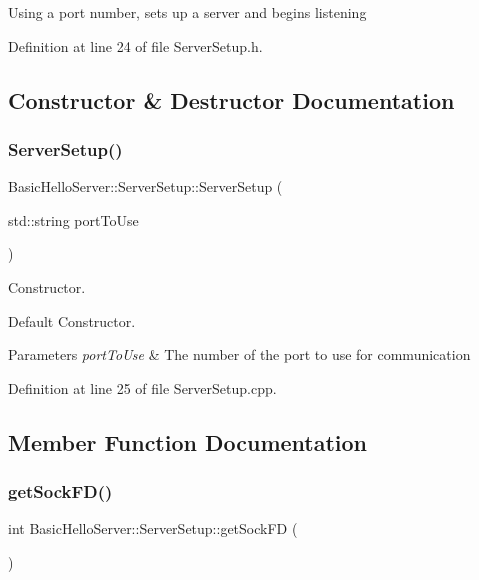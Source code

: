 Using a port number, sets up a server and begins listening 

Definition at line 24 of file Server\+Setup.\+h.



\subsection{Constructor \& Destructor Documentation}
\mbox{\label{classBasicHelloServer_1_1ServerSetup_ad2ef8a2e76a778fd7197efbbf6a38166}} 
\subsubsection{\texorpdfstring{ServerSetup()}{ServerSetup()}}
{\footnotesize\ttfamily Basic\+Hello\+Server\+::\+Server\+Setup\+::\+Server\+Setup (\begin{DoxyParamCaption}\item[{std\+::string}]{port\+To\+Use }\end{DoxyParamCaption})\hspace{0.3cm}{\ttfamily [explicit]}}



Constructor. 

Default Constructor.


\begin{DoxyParams}{Parameters}
{\em port\+To\+Use} & The number of the port to use for communication \\
\hline
\end{DoxyParams}


Definition at line 25 of file Server\+Setup.\+cpp.



\subsection{Member Function Documentation}
\mbox{\label{classBasicHelloServer_1_1ServerSetup_a61edf15413b9cb6332ca08e92a4c561d}} 
\subsubsection{\texorpdfstring{getSockFD()}{getSockFD()}}
{\footnotesize\ttfamily int Basic\+Hello\+Server\+::\+Server\+Setup\+::get\+Sock\+FD (\begin{DoxyParamCaption}{ }\end{DoxyParamCaption})}



